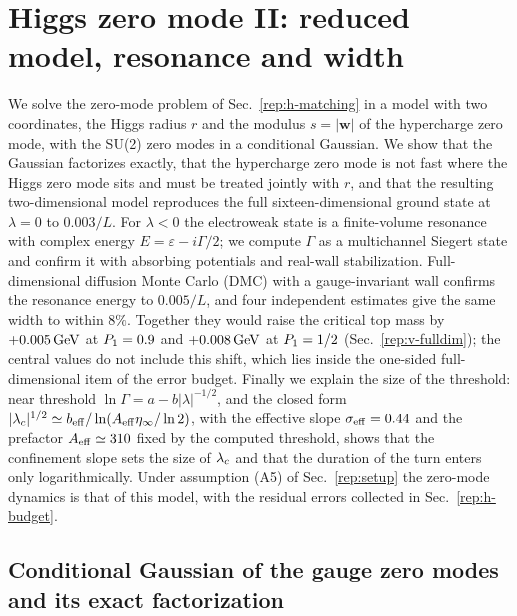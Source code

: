 \section{Higgs zero mode II: reduced model, resonance and width}\label{rep:h-reduced}

We solve the zero-mode problem of Sec.~\ref{rep:h-matching} in a model with two coordinates, the Higgs radius $r$ and the modulus $s=|\bm w|$ of the hypercharge zero mode, with the SU(2) zero modes in a conditional Gaussian.
We show that the Gaussian factorizes exactly, that the hypercharge zero mode is not fast where the Higgs zero mode sits and must be treated jointly with $r$, and that the resulting two-dimensional model reproduces the full sixteen-dimensional ground state at $\lambda=0$ to $0.003/L$. %
For $\lambda<0$ the electroweak state is a finite-volume resonance with complex energy $E=\varepsilon-i\Gamma/2$; we compute $\Gamma$ as a multichannel Siegert state and confirm it with absorbing potentials and real-wall stabilization.
Full-dimensional diffusion Monte Carlo (DMC) with a gauge-invariant wall confirms the resonance energy to $0.005/L$, and four independent estimates give the same width to within $8\%$.
Together they would raise the critical top mass by $+0.005\,\mathrm{GeV}$ at $P_1=0.9$ and $+0.008\,\mathrm{GeV}$ at $P_1=1/2$ (Sec.~\ref{rep:v-fulldim}); the central values do not include this shift, which lies inside the one-sided full-dimensional item of the error budget. %
Finally we explain the size of the threshold: near threshold $\ln\Gamma=a-b|\lambda|^{-1/2}$, and the closed form $|\lambda_c|^{1/2}\simeq b_{\rm eff}/\ln(A_{\rm eff}\eta_\infty/\ln2)$, with the effective slope $\sigma_{\rm eff}=0.44$ and the prefactor $A_{\rm eff}\simeq310$ fixed by the computed threshold, shows that the confinement slope sets the size of $\lambda_c$ and that the duration of the turn enters only logarithmically. %
Under assumption (A5) of Sec.~\ref{rep:setup} the zero-mode dynamics is that of this model, with the residual errors collected in Sec.~\ref{rep:h-budget}.

\subsection{Conditional Gaussian of the gauge zero modes and its exact factorization}
\label{sec:rb-gauss}

